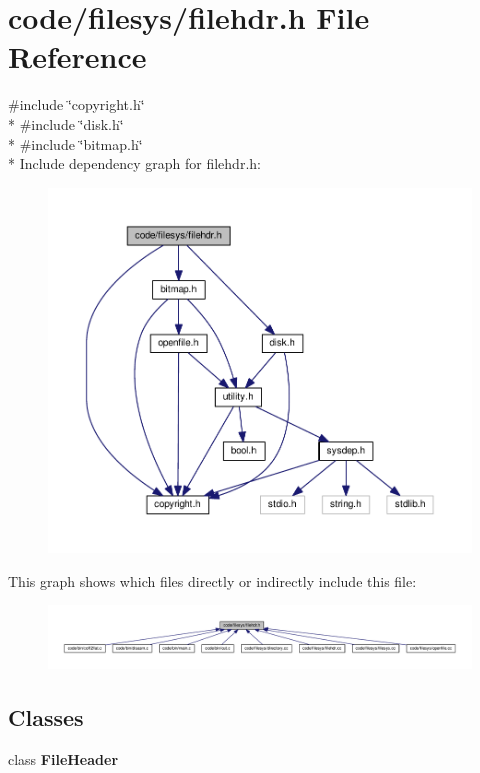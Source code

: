 \section{code/filesys/filehdr.h File Reference}
\label{filehdr_8h}
{\ttfamily \#include \char`\"{}copyright.\+h\char`\"{}}\\*
{\ttfamily \#include \char`\"{}disk.\+h\char`\"{}}\\*
{\ttfamily \#include \char`\"{}bitmap.\+h\char`\"{}}\\*
Include dependency graph for filehdr.\+h\+:
\nopagebreak
\begin{figure}[H]
\begin{center}
\leavevmode
\includegraphics[width=350pt]{filehdr_8h__incl}
\end{center}
\end{figure}
This graph shows which files directly or indirectly include this file\+:
\nopagebreak
\begin{figure}[H]
\begin{center}
\leavevmode
\includegraphics[width=350pt]{filehdr_8h__dep__incl}
\end{center}
\end{figure}
\subsection*{Classes}
\begin{DoxyCompactItemize}
\item 
class {\bf File\+Header}
\end{DoxyCompactItemize}
